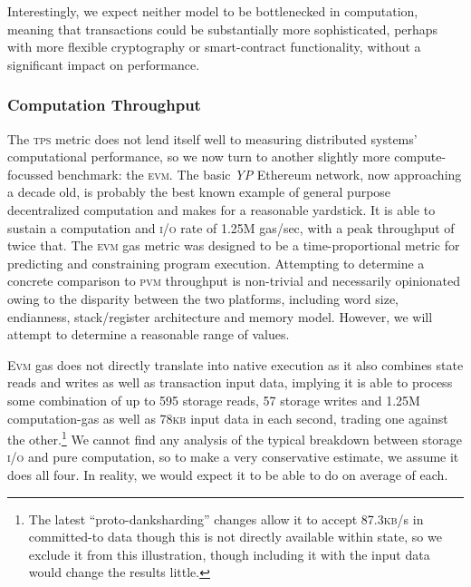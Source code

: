 Interestingly, we expect neither model to be bottlenecked in computation, meaning that transactions could be substantially more sophisticated, perhaps with more flexible cryptography or smart-contract functionality, without a significant impact on performance.

\subsubsection{Computation Throughput}
The \textsc{tps} metric does not lend itself well to measuring distributed systems' computational performance, so we now turn to another slightly more compute-focussed benchmark: the \textsc{evm}. The basic \emph{YP} Ethereum network, now approaching a decade old, is probably the best known example of general purpose decentralized computation and makes for a reasonable yardstick. It is able to sustain a computation and \textsc{i/o} rate of 1.25M gas/sec, with a peak throughput of twice that. The \textsc{evm} gas metric was designed to be a time-proportional metric for predicting and constraining program execution. Attempting to determine a concrete comparison to \textsc{pvm} throughput is non-trivial and necessarily opinionated owing to the disparity between the two platforms, including word size, endianness, stack/register architecture and memory model. However, we will attempt to determine a reasonable range of values.

\textsc{Evm} gas does not directly translate into native execution as it also combines state reads and writes as well as transaction input data, implying it is able to process some combination of up to 595 storage reads, 57 storage writes and 1.25M computation-gas as well as 78\textsc{kb} input data in each second, trading one against the other.\footnote{The latest ``proto-danksharding'' changes allow it to accept 87.3\textsc{kb}/s in committed-to data though this is not directly available within state, so we exclude it from this illustration, though including it with the input data would change the results little.} We cannot find any analysis of the typical breakdown between storage \textsc{i/o} and pure computation, so to make a very conservative estimate, we assume it does all four. In reality, we would expect it to be able to do on average  of each.

